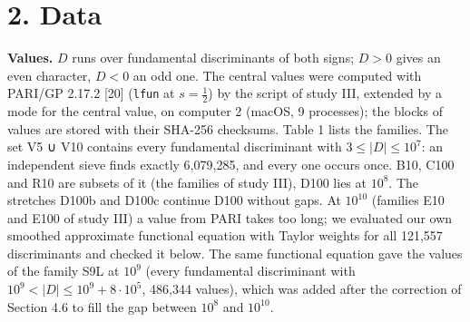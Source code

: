 \documentclass[
  10pt,
]{article}
\begin{document}
\hypertarget{data}{%
\section{2. Data}\label{data}}

\textbf{Values.} \(D\) runs over fundamental discriminants of both
signs; \(D > 0\) gives an even character, \(D < 0\) an odd one. The
central values were computed with PARI/GP 2.17.2 {[}20{]} (\texttt{lfun}
at \(s = \tfrac12\)) by the script of study III, extended by a mode for
the central value, on computer 2 (macOS, 9 processes); the blocks of
values are stored with their SHA-256 checksums. Table 1 lists the
families. The set V5 ∪ V10 contains every fundamental discriminant with
\(3 \le |D| \le 10^7\): an independent sieve finds exactly 6,079,285,
and every one occurs once. B10, C100 and R10 are subsets of it (the
families of study III), D100 lies at \(10^8\). The stretches D100b and
D100c continue D100 without gaps. At \(10^{10}\) (families E10 and E100
of study III) a value from PARI takes too long; we evaluated our own
smoothed approximate functional equation with Taylor weights for all
121,557 discriminants and checked it below. The same functional equation
gave the values of the family S9L at \(10^9\) (every fundamental
discriminant with \(10^9 < |D| \le 10^9 + 8\cdot10^5\), 486,344 values),
which was added after the correction of Section 4.6 to fill the gap
between \(10^8\) and \(10^{10}\).
\end{document}
